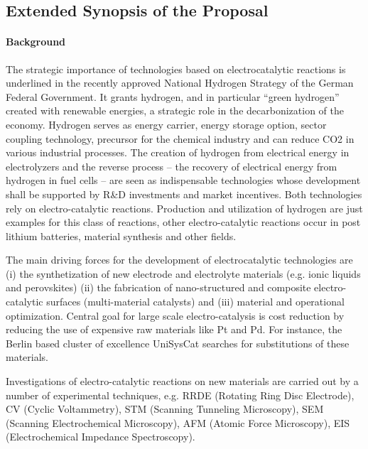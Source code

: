 \documentclass[a4paper,10pt]{article}
\begin{document}
\insertProjectHeader


\subsection*{Extended Synopsis of the Proposal}

\paragraph{Background}



The strategic importance of technologies based on electrocatalytic reactions is underlined in the recently approved National Hydrogen Strategy of the German Federal Government.  It grants hydrogen, and in particular ``green hydrogen'' created with renewable energies, a strategic role in the decarbonization of the economy. Hydrogen serves as energy carrier, energy storage option, sector coupling technology, precursor for the chemical industry and can reduce CO2 in various industrial processes.
The creation of hydrogen from electrical energy in electrolyzers and the reverse process -- the recovery of electrical energy from hydrogen in fuel cells -- are seen as indispensable technologies whose development shall be supported by R\&D investments and market incentives.
%
Both technologies rely on electro-catalytic reactions. Production and utilization of hydrogen are just examples for this class of reactions, other electro-catalytic reactions occur in post lithium batteries, material synthesis and other fields.

The main driving forces for the development of electrocatalytic technologies are (i) the synthetization of new electrode and electrolyte materials (e.g. ionic liquids and perovskites) (ii) the fabrication of nano-structured and composite electro-catalytic surfaces (multi-material catalysts) and (iii) material and operational optimization. Central goal for large scale electro-catalysis is cost
reduction by reducing the use of expensive raw materials like Pt and  Pd. For instance, the Berlin based cluster of excellence UniSysCat searches for substitutions of these materials.

Investigations of electro-catalytic reactions on new materials
are carried out by a number of  experimental techniques,  e.g.
RRDE    (Rotating   Ring    Disc   Electrode),
CV  (Cyclic  Voltammetry),
STM (Scanning Tunneling Microscopy),
SEM (Scanning  Electrochemical Microscopy),
AFM (Atomic Force Microscopy),
EIS (Electrochemical Impedance Spectroscopy).
\end{document}
